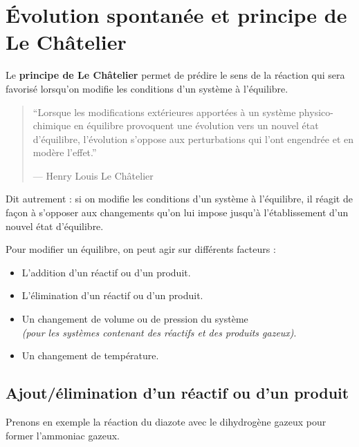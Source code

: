 \documentclass[
  11pt,
  french,
  a4paper,
  openany]{book}
\providecommand{\tightlist}{%
  \setlength{\itemsep}{0pt}\setlength{\parskip}{0pt}}
\begin{document}
\hypertarget{uxe9volution-spontanuxe9e-et-principe-de-le-chuxe2telier}{%
\section{Évolution spontanée et principe de Le Châtelier}\label{uxe9volution-spontanuxe9e-et-principe-de-le-chuxe2telier}}

Le \textbf{principe de Le Châtelier} permet de prédire le sens de la réaction qui sera favorisé lorsqu'on modifie les conditions d'un système à l'équilibre.

\begin{quote}
``Lorsque les modifications extérieures apportées à un système physico-chimique en équilibre provoquent une évolution vers un nouvel état d'équilibre, l'évolution s'oppose aux perturbations qui l'ont engendrée et en modère l'effet.''

--- Henry Louis Le Châtelier
\end{quote}

Dit autrement : si on modifie les conditions d'un système à l'équilibre, il réagit de façon à s'opposer aux changements qu'on lui impose jusqu'à l'établissement d'un nouvel état d'équilibre.

Pour modifier un équilibre, on peut agir sur différents facteurs :

\begin{itemize}
\tightlist
\item
  L'addition d'un réactif ou d'un produit.
\item
  L'élimination d'un réactif ou d'un produit.
\item
  Un changement de volume ou de pression du système\\
  \emph{(pour les systèmes contenant des réactifs et des produits gazeux)}.
\item
  Un changement de température.
\end{itemize}

\clearpage

\hypertarget{ajoutuxe9limination-dun-ruxe9actif-ou-dun-produit}{%
\subsection{Ajout/élimination d'un réactif ou d'un produit}\label{ajoutuxe9limination-dun-ruxe9actif-ou-dun-produit}}

Prenons en exemple la réaction du diazote avec le dihydrogène gazeux pour former l'ammoniac gazeux.
\end{document}
